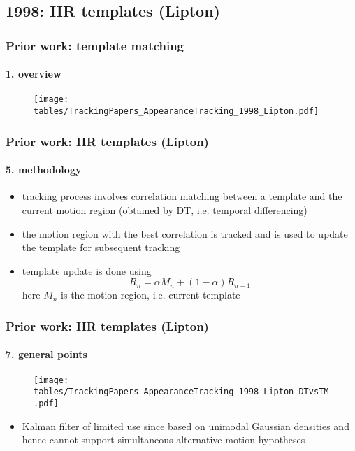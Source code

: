 \subsection{1998: IIR templates (Lipton)}
\begin{frame}
\frametitle{Prior work: template matching}
\framesubtitle{1. overview}
\mypagenum
{}
	\begin{figure}
		\texttt{[image: tables/TrackingPapers\_AppearanceTracking\_1998\_Lipton.pdf]}
	\end{figure}
\end{frame}



\begin{frame}
\frametitle{Prior work: IIR templates (Lipton)}
\framesubtitle{5. methodology}
\logoCSIPCPL\mypagenum
{}
	\begin{itemize}
		\item tracking process involves correlation matching between a template and the current motion region (obtained by DT, i.e. temporal differencing)
		\item the motion region with the best correlation is tracked and is used to update the template for subsequent tracking
		\item template update is done using 	
		\begin{equation*}
			R_n = \alpha M_n + (1- \alpha)R_{n-1}
		\end{equation*}
		here $M_n$ is the motion region, i.e. current template
	\end{itemize}
\end{frame}


\begin{frame}
\frametitle{Prior work: IIR templates (Lipton)}
\framesubtitle{7. general points}
\logoCSIPCPL\mypagenum
{}
	\begin{figure}
		\texttt{[image: tables/TrackingPapers\_AppearanceTracking\_1998\_Lipton\_DTvsTM.pdf]}
	\end{figure}
	\begin{itemize}
		\item Kalman filter of limited use since based on unimodal Gaussian densities and hence cannot support simultaneous alternative motion hypotheses
	\end{itemize}
\end{frame}





